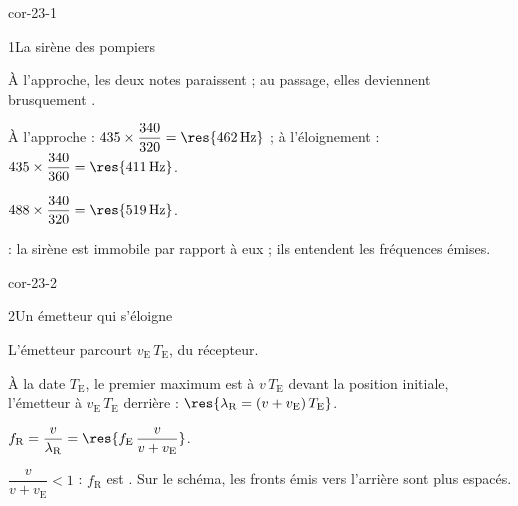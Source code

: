 \corrigesSouples

\begin{blocLivre}{cor-23-1}
\begin{corrige}{1}{La sirène des pompiers}
\begin{questions}
\item À l'approche, les deux notes paraissent  ; au passage, elles deviennent brusquement .
\item À l'approche : $435\times\dfrac{340}{320}=\res{\qty{462}{Hz}}$ ; à l'éloignement : $435\times\dfrac{340}{360}=\res{\qty{411}{Hz}}$.
\item $488\times\dfrac{340}{320}=\res{\qty{519}{Hz}}$.
\item {} : la sirène est immobile par rapport à eux ; ils entendent les fréquences émises.
\end{questions}
\end{corrige}
\end{blocLivre}
\begin{blocLivre}{cor-23-2}
\begin{corrige}{2}{Un émetteur qui s'éloigne}
\begin{questions}
\item L'émetteur parcourt $v_\mathrm{E}\,T_\mathrm{E}$,  du récepteur.
\item À la date $T_\mathrm{E}$, le premier maximum est à $v\,T_\mathrm{E}$ devant la position initiale, l'émetteur à $v_\mathrm{E}\,T_\mathrm{E}$ derrière :
$\res{\lambda_\mathrm{R}=(v+v_\mathrm{E})\,T_\mathrm{E}}$.
\item $f_\mathrm{R}=\dfrac{v}{\lambda_\mathrm{R}}=\res{f_\mathrm{E}\,\dfrac{v}{v+v_\mathrm{E}}}$.
\item $\dfrac{v}{v+v_\mathrm{E}}<1$ : $f_\mathrm{R}$ est . Sur le schéma, les fronts émis vers l'arrière sont plus espacés.
\end{questions}
\end{corrige}
\end{blocLivre}
